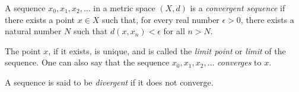 \documentclass{article}
\begin{document}
A sequence $x_0, x_1, x_2, \dots$ in a metric space $(X,d)$ is a \emph{convergent sequence} if there exists a point $x \in X$ such that, for every real number $\epsilon > 0$, there exists a natural number $N$ such that $d(x,x_n) < \epsilon$ for all $n > N$.

The point $x$, if it exists, is unique, and is called the \emph{limit point} or \emph{limit} of the sequence. One can also say that the sequence $x_0, x_1, x_2, \dots$ \emph{converges} to $x$.

A sequence is said to be \emph{divergent} if it does not converge.
\end{document}
